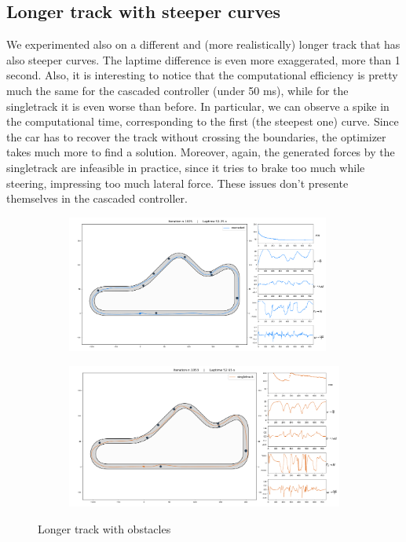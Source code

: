 \documentclass[a4paper, onecolumn, 11pt]{article}
\begin{document}
\subsection{Longer track with steeper curves}

We experimented also on a different and (more realistically) longer track that
has also steeper curves. The laptime difference is even more exaggerated, more
than 1 second. Also, it is interesting to notice that the computational
efficiency is pretty much the same for the cascaded controller (under 50 ms),
while for the singletrack it is even worse than before. In particular, we can
observe a spike in the computational time, corresponding to the first (the
steepest one) curve. Since the car has to recover the track without crossing the
boundaries, the optimizer takes much more to find a solution. Moreover, again,
the generated forces by the singletrack are infeasible in practice, since it
tries to brake too much while steering, impressing too much lateral force. These
issues don't presente themselves in the cascaded controller. 
\begin{figure}[H]
    \centering
    \begin{subfigure}{0.9\textwidth}
        \centering
        \includegraphics[width=0.95\textwidth]{assets/obstacles_shoe.png}
    \end{subfigure}
    \begin{subfigure}{0.9\textwidth}
        \centering
        \includegraphics[width=\textwidth]{assets/singletrack_obstacles_shoe.png}
    \end{subfigure}
    \caption{Longer track with obstacles}
\end{figure}
\end{document}
